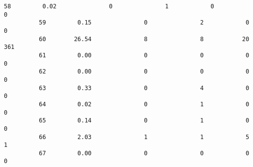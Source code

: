 \documentclass[11pt]{article}
\begin{document}
\begin{Verbatim}[commandchars=\\\{\}]
          58         0.02               0               1            0            0   
          59         0.15               0               2            0            0   
          60        26.54               8               8           20          361   
          61         0.00               0               0            0            0   
          62         0.00               0               0            0            0   
          63         0.33               0               4            0            0   
          64         0.02               0               1            0            0   
          65         0.14               0               1            0            0   
          66         2.03               1               1            5            1   
          67         0.00               0               0            0            0   
          

\end{Verbatim}
\end{document}
